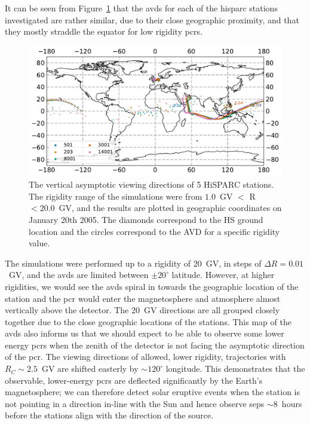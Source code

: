 It can be seen from Figure~\ref{fig:HS_AVD} that the \glspl{avd} for each of the \gls{hisparc} stations investigated are rather similar, due to their close geographic proximity, and that they mostly straddle the equator for low rigidity \glspl{pcr}. 

\begin{figure}[ht!]
	\centering
	\includegraphics[scale=0.6]{HS_AVDs.pdf}
	\caption{The vertical asymptotic viewing directions of 5 HiSPARC stations. The rigidity range of the simulations were from $1.0$~GV $<$ R $<20.0$~GV, and the results are plotted in geographic coordinates on January 20th 2005. The diamonds correspond to the HS ground location and the circles correspond to the AVD for a specific rigidity value.}
	\label{fig:HS_AVD}
\end{figure}

The simulations were performed up to a rigidity of 20~GV, in steps of $\Delta R = 0.01$~GV, and the \glspl{avd} are limited between $\pm 20^{\circ}$ latitude. However, at higher rigidities, we would see the \glspl{avd} spiral in towards the geographic location of the station and the \gls{pcr} would enter the magnetosphere and atmosphere almost vertically above the detector. The 20~GV directions are all grouped closely together due to the close geographic locations of the stations. This map of the \glspl{avd} also informs us that we should expect to be able to observe some lower energy \glspl{pcr} when the zenith of the detector is not facing the asymptotic direction of the \gls{pcr}. The viewing directions of allowed, lower rigidity, trajectories with $R_C \sim 2.5$~GV are shifted easterly by $\sim 120^{\circ}$ longitude. This demonstrates that the observable, lower-energy \glspl{pcr} are deflected significantly by the Earth's magnetosphere; we can therefore detect solar eruptive events when the station is not pointing in a direction in-line with the Sun and hence observe \glspl{sep} $\sim 8$~hours before the stations align with the direction of the source.


